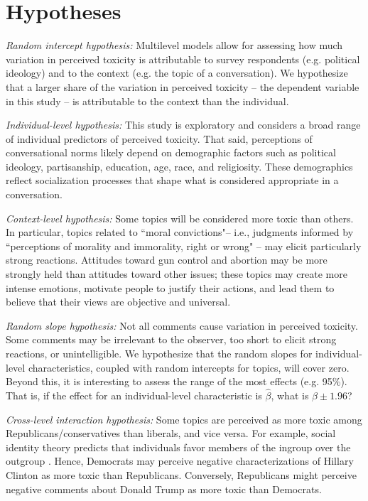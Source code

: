 \documentclass{article}
\begin{document}
\section{Hypotheses}

\textit{Random intercept hypothesis:} Multilevel models allow for assessing how much variation in perceived toxicity is attributable to survey respondents (e.g. political ideology) and to the context (e.g. the topic of a conversation). We hypothesize that a larger share of the variation in perceived toxicity -- the dependent variable in this study -- is attributable to the context than the individual.

\textit{Individual-level hypothesis:} This study is exploratory and considers a broad range of individual predictors of perceived toxicity. That said, perceptions of conversational norms likely depend on demographic factors such as political ideology, partisanship, education, age, race, and religiosity. These demographics reflect socialization processes that shape what is considered appropriate in a conversation. 

\textit{Context-level hypothesis:} Some topics will be considered more toxic than others. In particular, topics related to ``moral convictions"-- i.e., judgments informed by ``perceptions of morality and immorality, right or wrong" \citep{skitka_conviction_2010} -- may elicit particularly strong reactions. Attitudes toward gun control and abortion may be more strongly held than attitudes toward other issues; these topics may create more intense emotions, motivate people to justify their actions, and lead them to believe that their views are objective and universal. 

\textit{Random slope hypothesis:} Not all comments cause variation in perceived toxicity. Some comments may be irrelevant to the observer, too short to elicit strong reactions, or unintelligible. We hypothesize that the random slopes for individual-level characteristics, coupled with random intercepts for topics, will cover zero. Beyond this, it is interesting to assess the range of the most effects (e.g. 95\%). That is, if the effect for an individual-level characteristic is $\hat \beta$, what is $\beta\pm 1.96$?

\textit{Cross-level interaction hypothesis:} Some topics are perceived as more toxic among Republicans/conservatives than liberals, and vice versa. For example, social identity theory predicts that individuals favor members of the ingroup over the outgroup \citep{tafjelturner_identity_2004}. Hence, Democrats may perceive negative characterizations of Hillary Clinton as more toxic than Republicans. Conversely, Republicans might perceive negative comments about Donald Trump as more toxic than Democrats.
\end{document}
